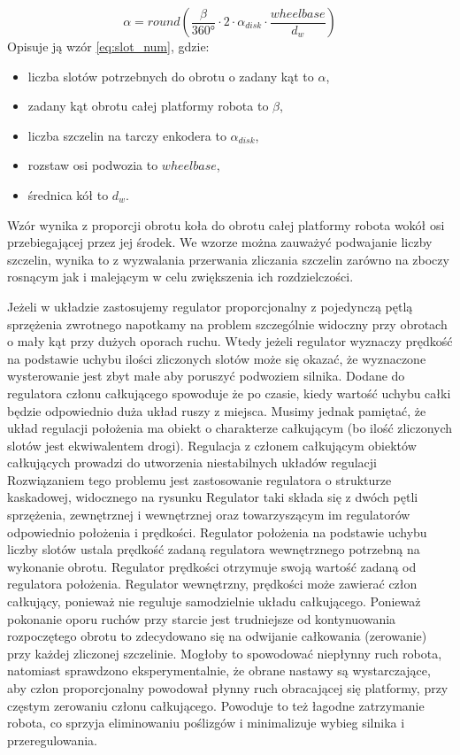 \documentclass[11pt]{article}
\begin{document}
\begin{equation}
	\label{eq:slot_num}
	\alpha = round \left( \frac{\beta}{ \ang{360}} \cdot 2 \cdot \alpha_{disk} \cdot \frac{wheelbase}{d_w} \right)
\end{equation}
Opisuje ją wzór \ref{eq:slot_num}, gdzie:
\begin{itemize}
	\item liczba slotów potrzebnych do obrotu o zadany kąt to $ \alpha $,
	\item zadany kąt obrotu całej platformy robota to $ \beta $,
	\item liczba szczelin na tarczy enkodera to $ \alpha_{disk} $,
	\item rozstaw osi podwozia to $ wheelbase $,
	\item średnica kół to $ d_w $.
\end{itemize}
Wzór wynika z proporcji obrotu koła do obrotu całej platformy robota wokół osi przebiegającej przez jej środek.
We wzorze można zauważyć podwajanie liczby szczelin, wynika to z wyzwalania przerwania zliczania szczelin zarówno na zboczy rosnącym jak i malejącym w celu zwiększenia ich rozdzielczości.


Jeżeli w układzie zastosujemy regulator proporcjonalny z pojedynczą pętlą sprzężenia zwrotnego napotkamy na problem szczególnie widoczny przy obrotach o mały kąt przy dużych oporach ruchu.
Wtedy jeżeli regulator wyznaczy prędkość na podstawie uchybu ilości zliczonych slotów może się okazać, że wyznaczone wysterowanie jest zbyt małe aby poruszyć podwoziem silnika.
Dodane do regulatora członu całkującego spowoduje że po czasie, kiedy wartość uchybu całki będzie odpowiednio duża układ ruszy z miejsca.
Musimy jednak pamiętać, że układ regulacji położenia ma obiekt o charakterze całkującym (bo ilość zliczonych slotów jest ekwiwalentem drogi).
Regulacja z członem całkującym obiektów całkujących prowadzi do utworzenia niestabilnych układów regulacji %
Rozwiązaniem tego problemu jest zastosowanie regulatora o strukturze kaskadowej, widocznego na rysunku %
Regulator taki składa się z dwóch pętli sprzężenia, zewnętrznej i wewnętrznej oraz towarzyszącym im regulatorów odpowiednio położenia i prędkości.
Regulator położenia na podstawie uchybu liczby slotów ustala prędkość zadaną regulatora wewnętrznego potrzebną na wykonanie obrotu.
Regulator prędkości otrzymuje swoją wartość zadaną od regulatora położenia.
Regulator wewnętrzny, prędkości może zawierać człon całkujący, ponieważ nie reguluje samodzielnie układu całkującego.
Ponieważ pokonanie oporu ruchów przy starcie jest trudniejsze od kontynuowania rozpoczętego obrotu %
to zdecydowano się na odwijanie całkowania (zerowanie) przy każdej zliczonej szczelinie.
Mogłoby to spowodować niepłynny ruch robota, natomiast sprawdzono eksperymentalnie, że obrane nastawy są wystarczające, aby człon proporcjonalny powodował płynny ruch obracającej się platformy, przy częstym zerowaniu członu całkującego.
Powoduje to też łagodne zatrzymanie robota, co sprzyja eliminowaniu poślizgów i minimalizuje wybieg silnika i przeregulowania.
\end{document}
